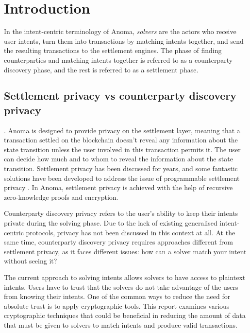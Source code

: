 \documentclass[
    9pt,            %
    report,        %
    affiltop,       %
]{art}
\begin{document}
\maketitle

\section{Introduction}\label{intro}

In the intent-centric terminology of Anoma, \emph{solvers} are the actors who receive user intents, turn them into transactions by matching intents together, and send the resulting transactions to the settlement engines. The phase of finding counterparties and matching intents together is referred to as a counterparty discovery phase, and the rest is referred to as a settlement phase.

\subsection{Settlement privacy vs counterparty discovery privacy}. Anoma is designed to provide privacy on the settlement layer,  meaning that a transaction settled on the blockchain doesn't reveal any information about the state transition unless the user involved in this transaction permits it. The user can decide how much and to whom to reveal the information about the state transition. Settlement privacy has been discussed for years, and some fantastic solutions have been developed to address the issue of programmable settlement privacy \citep{zcash, vzexe}. In Anoma, settlement privacy is achieved with the help of recursive zero-knowledge proofs and encryption.

\hfill

Counterparty discovery privacy refers to the user's ability to keep their intents private during the solving phase.
Due to the lack of existing generalised intent-centric protocols, privacy has not been discussed in this context at all. At the same time, counterparty discovery privacy requires approaches different from settlement privacy, as it faces different issues: how can a solver match your intent without seeing it?

\hfill

The current approach to solving intents allows solvers to have access to plaintext intents. Users have to trust that the solvers do not take advantage of the users from knowing their intents. One of the common ways to reduce the need for absolute trust is to apply cryptographic tools. This report examines various cryptographic techniques that could be beneficial in reducing the amount of data that must be given to solvers to match intents and produce valid transactions.
\end{document}
